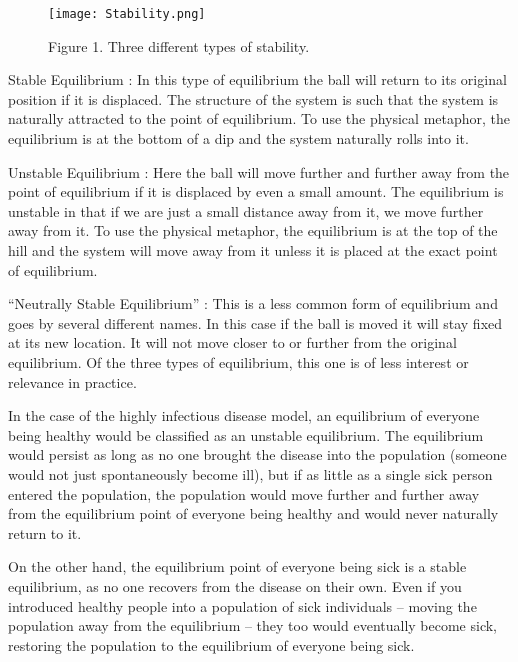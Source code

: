 \documentclass[]{memoir}
\let\Oldincludegraphics\includegraphics
\renewcommand{\includegraphics}[1]{\Oldincludegraphics[max size={\textwidth}{\textheight}]{#1}}
\begin{document}
\begin{figure}[htbp]
\centering
\texttt{[image: Stability.png]}
\caption{Figure 1. Three different types of stability.}
\end{figure}

Stable Equilibrium : In this type of equilibrium the ball will return to
its original position if it is displaced. The structure of the system is
such that the system is naturally attracted to the point of equilibrium.
To use the physical metaphor, the equilibrium is at the bottom of a dip
and the system naturally rolls into it.

Unstable Equilibrium : Here the ball will move further and further away
from the point of equilibrium if it is displaced by even a small amount.
The equilibrium is unstable in that if we are just a small distance away
from it, we move further away from it. To use the physical metaphor, the
equilibrium is at the top of the hill and the system will move away from
it unless it is placed at the exact point of equilibrium.

``Neutrally Stable Equilibrium'' : This is a less common form of
equilibrium and goes by several different names. In this case if the
ball is moved it will stay fixed at its new location. It will not move
closer to or further from the original equilibrium. Of the three types
of equilibrium, this one is of less interest or relevance in practice.

In the case of the highly infectious disease model, an equilibrium of
everyone being healthy would be classified as an unstable equilibrium.
The equilibrium would persist as long as no one brought the disease into
the population (someone would not just spontaneously become ill), but if
as little as a single sick person entered the population, the population
would move further and further away from the equilibrium point of
everyone being healthy and would never naturally return to it.

On the other hand, the equilibrium point of everyone being sick is a
stable equilibrium, as no one recovers from the disease on their own.
Even if you introduced healthy people into a population of sick
individuals -- moving the population away from the equilibrium -- they
too would eventually become sick, restoring the population to the
equilibrium of everyone being sick.

\end{document}
